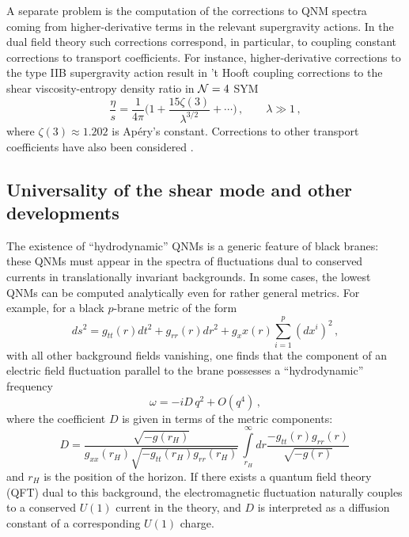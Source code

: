 \documentclass[]{iopart}
\begin{document}
A separate problem is the computation of the corrections to QNM spectra coming
from higher-derivative terms in the relevant supergravity actions. In the dual
field theory such corrections correspond, in particular, to coupling constant
corrections to transport coefficients. For instance, higher-derivative
corrections to the type IIB supergravity action result in 't Hooft coupling
corrections to the shear viscosity-entropy density ratio in ${\cal N}=4$ SYM
\cite{Buchel:2004di, Buchel:2008sh, Myers:2008yi}
%
\begin{equation}
\frac{\eta}{s} = \frac{1}{4\pi} \Biggl( 1 + \frac{15 \zeta (3)}{ \lambda^{3/2}} 
+ \cdots \Biggr)\,, \qquad \lambda \gg 1\,,
\label{visc_corr}
\end{equation}
%
where $\zeta(3) \approx 1.202$ is Ap\'{e}ry's constant.  Corrections to other
transport coefficients have also been considered \cite{Haack:2008xx,
  Ritz:2008kh, Myers:2009ij, Cremonini:2009sy}.

\subsection{\label{sec:visco}Universality of the shear mode and other developments}

The existence of ``hydrodynamic'' QNMs is a generic feature of black branes:
these QNMs must appear in the spectra of fluctuations dual to conserved
currents in translationally invariant backgrounds. In some cases, the lowest
QNMs can be computed analytically even for rather general metrics. For
example, for a black $p$-brane metric of the form
%
\begin{equation}
ds^2 = g_{tt}(r) dt^2 + g_{rr}(r) dr^2 + g_xx(r) \sum\limits_{i=1}^p \left( dx^i\right)^2\,,
\label{generic_m}
\end{equation}
%
with all other background fields vanishing, one finds that the component of an
electric field fluctuation parallel to the brane possesses a ``hydrodynamic''
frequency
%
\begin{equation}
\omega = - i D\, q^2 + O \left( q^4\right)\,,
\label{diff_w}
\end{equation}
%
where the coefficient $D$ is given in terms of the metric components:
%
\begin{equation}
D = \frac{\sqrt{-g(r_H)}}{g_{xx}(r_H) \sqrt{-g_{tt}(r_H)g_{rr}(r_H)}}\,
 \int\limits_{r_H}^\infty dr \frac{- g_{tt}(r)g_{rr}(r)}{\sqrt{-g(r)}}\,
\label{D_const}
\end{equation}
%
and $r_H$ is the position of the horizon.  If there exists a quantum field
theory (QFT) dual to this background, the electromagnetic fluctuation
naturally couples to a conserved $U(1)$ current in the theory, and $D$ is
interpreted as a diffusion constant of a corresponding $U(1)$ charge.
\end{document}
